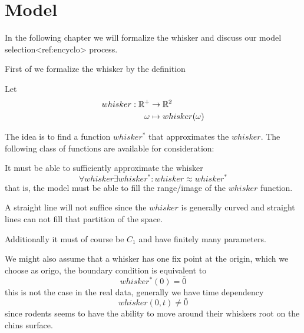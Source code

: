 \section{Model}


In the following chapter we will formalize the whisker and discuss our model
selection<ref:encyclo> process.

First of we formalize the whisker by the definition

\begin{definition}
    Let 
    \begin{equation}
    \begin{split}
        whisker : \mathbb{R}^+ &\rightarrow \mathbb{R}^2 \\
                  \omega&\mapsto whisker(\omega)
    \end{split}
    \end{equation}
\end{definition}

The idea is to find a function $whisker^*$ that approximates the $whisker$. The 
following class of functions are available for consideration:

It must be able to sufficiently approximate the whisker
\begin{equation}
    \forall whisker \exists whisker^* : whisker \approx whisker^*
\end{equation}
that is, the model must be able to fill the range/image of the $whisker$ function.

\begin{example}
    A straight line will not suffice since the $whisker$ is generally
    curved and straight lines can not fill that partition of the space.
\end{example}

Additionally it must of course be $C_1$ and have finitely many parameters.

We might also assume that a whisker has one fix point at the origin, which we
choose as origo, the boundary condition is equivalent to
\begin{equation}
    \label{eq:bv_root}
    whisker^*(0)=\bar{0}
\end{equation}
this is not the case in the real data, generally we have time dependency
\begin{equation}
    whisker(0,t)\neq\bar{0} 
\end{equation}
since rodents seems to have the ability to move around their whiskers root on
the chins surface.

